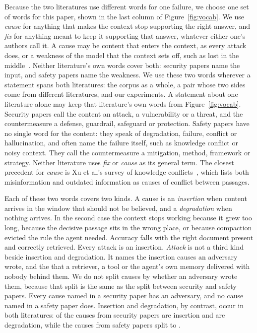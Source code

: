 Because the two literatures use different words for one failure, we choose
one set of words for this paper, shown in the last column of
Figure~\ref{fig:vocab}. We use \emph{cause} for anything that makes the context
stop supporting the right answer, and \emph{fix} for anything meant to keep
it supporting that answer, whatever either one's authors call it. A cause may
be content that enters the context, as every attack does, or a weakness of
the model that the context sets off, such as lost in the
middle~\cite{liu-2023-lost}. Neither literature's own words cover both:
security papers name the input, and safety papers name the weakness. We use
these two words wherever a statement spans both literatures: the corpus
as a whole, a pair whose two sides come from different literatures, and our
experiments. A statement about one literature alone may keep that literature's own
words from Figure~\ref{fig:vocab}. Security papers call the content an attack, a
vulnerability or a threat, and the countermeasure a defense, guardrail,
safeguard or protection. Safety papers have no single word for the content: they speak
of degradation, failure, conflict or hallucination, and often name the
failure itself, such as knowledge conflict or noisy context. They call the
countermeasure a mitigation, method, framework or strategy. Neither literature
uses \emph{fix} or \emph{cause} as its general term. The closest precedent for
\emph{cause} is Xu et al.'s survey of knowledge
conflicts~\cite{xu-2024-knowledge}, which lists both misinformation and
outdated information as causes of conflict between passages.

Each of these two words covers two kinds. A cause is an \emph{insertion} when content
arrives in the window that should not be believed, and a \emph{degradation}
when nothing arrives. In the second case the context stops working because it
grew too long, because the decisive passage sits in the wrong place, or
because compaction evicted the rule the agent needed. Accuracy falls with the
right document present and correctly retrieved. Every attack is an
insertion. \emph{Attack} is not a third kind beside insertion and
degradation. It names the \NAttack{} insertion
causes an adversary wrote, and the \NAccident{} that a retriever, a
tool or the agent's own memory delivered with nobody behind them. We do not split causes by whether an adversary wrote them, because that
split is the same as the split between security and safety papers. Every cause
named in a security paper has an adversary, and no cause named in a safety paper
does. Insertion and degradation, by contrast, occur in both literatures:
\NSecInsertion{} of the \NMechSecurity{} causes from security papers are
insertion and \NSecDegradation{} are degradation, while the causes from safety
papers split \NSafInsertion{} to \NSafDegradation{}.

